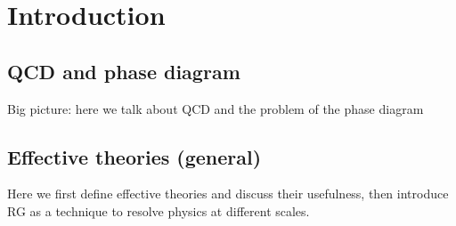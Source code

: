 \chapter{Introduction}
\section{QCD and phase diagram}
Big picture: here we talk about QCD and the problem of the phase diagram
\section{Effective theories (general)}
Here we first define effective theories and discuss their usefulness, then introduce RG as a technique to resolve physics at different scales.